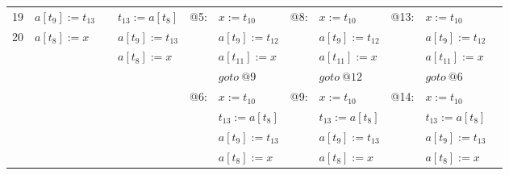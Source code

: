 \begin{scriptsize}
\begin{tabular}{rllllllllll}
19 & $a[t_{9}]:=t_{13}$ &  & $t_{13}:=a[t_{8}]$ & @5: & $x:=t_{10}$ & @8: & $x:=t_{10}$ & @13: & $x:=t_{10}$ & \\
20 & $a[t_{8}]:=x$ &  & $a[t_{9}]:=t_{13}$ &  & $a[t_{9}]:=t_{12}$ &  & $a[t_{9}]:=t_{12}$ &  & $a[t_{9}]:=t_{12}$ & \\
 & &  & $a[t_{8}]:=x$ &  & $a[t_{11}]:=x$ &  & $a[t_{11}]:=x$ &  & $a[t_{11}]:=x$ & \\
 & &  & &  & $goto\:@9$ &  & $goto\:@12$ &  & $goto\:@6$ & \\
 & &  & & @6: & $x:=t_{10}$ & @9: & $x:=t_{10}$ & @14: & $x:=t_{10}$ & \\
 & &  & &  & $t_{13}:=a[t_{8}]$ &  & $t_{13}:=a[t_{8}]$ &  & $t_{13}:=a[t_{8}]$ & \\
 & &  & &  & $a[t_{9}]:=t_{13}$ &  & $a[t_{9}]:=t_{13}$ &  & $a[t_{9}]:=t_{13}$ & \\
 & &  & &  & $a[t_{8}]:=x$ &  & $a[t_{8}]:=x$ &  & $a[t_{8}]:=x$ & \\
\end{tabular}

\end{scriptsize}
